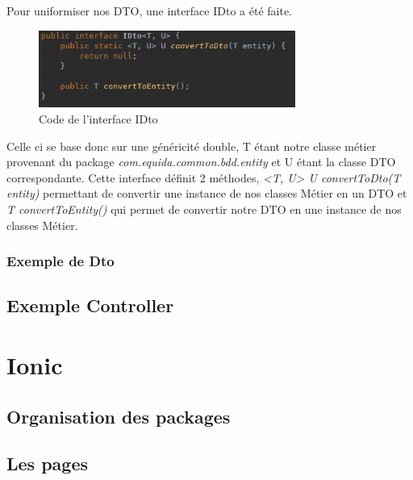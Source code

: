 				Pour uniformiser nos DTO, une interface IDto a été faite.

				\begin{figure}[H]
					\centering\includegraphics[width=0.75\textwidth, keepaspectratio]{res/idto.png}
					\caption{Code de l'interface IDto}
				\end{figure}

				Celle ci se base donc sur une généricité double, T étant notre classe métier provenant du package \textit{com.equida.common.bdd.entity} et U étant la classe DTO correspondante. Cette interface définit 2 méthodes, \textit{<T, U> U convertToDto(T entity)} permettant de convertir une instance de nos classes Métier en un DTO et \textit{T convertToEntity()} qui permet de convertir notre DTO en une instance de nos classes Métier.

			\subsubsection{Exemple de Dto}


		\subsection{Exemple Controller}


	\section{Ionic}

		\subsection{Organisation des packages}


		\subsection{Les pages}

